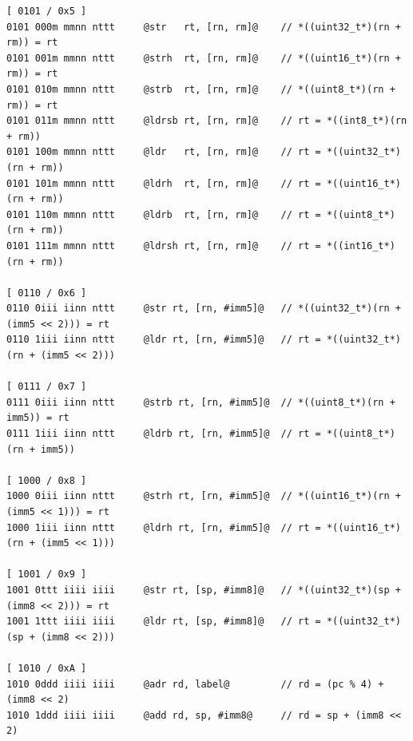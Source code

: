 \documentclass
[
    10pt,
    a4paper,
]
{article}
\begin{document}
\begin{lstlisting}[language=gnu-asm]
[ 0101 / 0x5 ]
0101 000m mmnn nttt     @str   rt, [rn, rm]@    // *((uint32_t*)(rn + rm)) = rt
0101 001m mmnn nttt     @strh  rt, [rn, rm]@    // *((uint16_t*)(rn + rm)) = rt
0101 010m mmnn nttt     @strb  rt, [rn, rm]@    // *((uint8_t*)(rn + rm)) = rt
0101 011m mmnn nttt     @ldrsb rt, [rn, rm]@    // rt = *((int8_t*)(rn + rm))
0101 100m mmnn nttt     @ldr   rt, [rn, rm]@    // rt = *((uint32_t*)(rn + rm))
0101 101m mmnn nttt     @ldrh  rt, [rn, rm]@    // rt = *((uint16_t*)(rn + rm))
0101 110m mmnn nttt     @ldrb  rt, [rn, rm]@    // rt = *((uint8_t*)(rn + rm))
0101 111m mmnn nttt     @ldrsh rt, [rn, rm]@    // rt = *((int16_t*)(rn + rm))

[ 0110 / 0x6 ]
0110 0iii iinn nttt     @str rt, [rn, #imm5]@   // *((uint32_t*)(rn + (imm5 << 2))) = rt
0110 1iii iinn nttt     @ldr rt, [rn, #imm5]@   // rt = *((uint32_t*)(rn + (imm5 << 2)))

[ 0111 / 0x7 ]
0111 0iii iinn nttt     @strb rt, [rn, #imm5]@  // *((uint8_t*)(rn + imm5)) = rt
0111 1iii iinn nttt     @ldrb rt, [rn, #imm5]@  // rt = *((uint8_t*)(rn + imm5))

[ 1000 / 0x8 ]
1000 0iii iinn nttt     @strh rt, [rn, #imm5]@  // *((uint16_t*)(rn + (imm5 << 1))) = rt
1000 1iii iinn nttt     @ldrh rt, [rn, #imm5]@  // rt = *((uint16_t*)(rn + (imm5 << 1)))

[ 1001 / 0x9 ]
1001 0ttt iiii iiii     @str rt, [sp, #imm8]@   // *((uint32_t*)(sp + (imm8 << 2))) = rt
1001 1ttt iiii iiii     @ldr rt, [sp, #imm8]@   // rt = *((uint32_t*)(sp + (imm8 << 2)))

[ 1010 / 0xA ]
1010 0ddd iiii iiii     @adr rd, label@         // rd = (pc % 4) + (imm8 << 2)
1010 1ddd iiii iiii     @add rd, sp, #imm8@     // rd = sp + (imm8 << 2)


\end{lstlisting}
\end{document}
